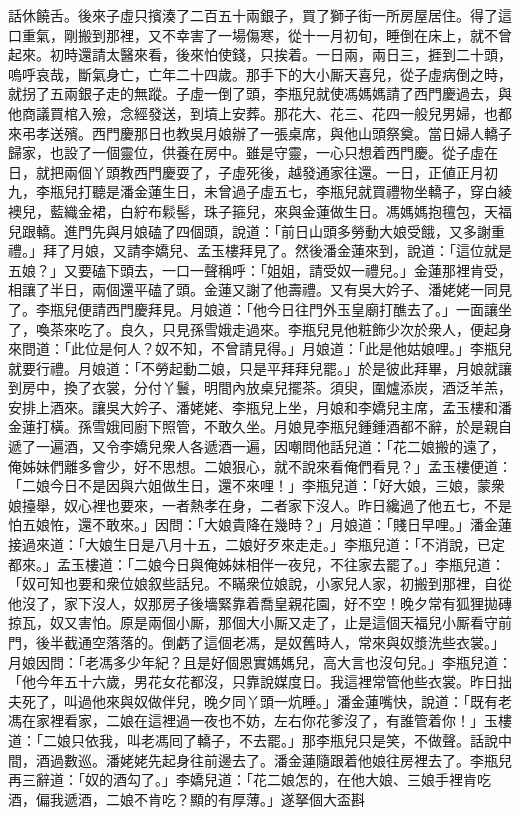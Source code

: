 話休饒舌。後來子虛只擯湊了二百五十兩銀子，買了獅子街一所房屋居住。得了這口重氣，剛搬到那裡，又不幸害了一場傷寒，從十一月初旬，睡倒在床上，就不曾起來。初時還請太醫來看，後來怕使錢，只挨着。一日兩，兩日三，捱到二十頭，嗚呼哀哉，斷氣身亡，亡年二十四歲。{}那手下的大小厮天喜兒，從子虛病倒之時，就拐了五兩銀子走的無蹤。子虛一倒了頭，李瓶兒就使馮媽媽請了西門慶過去，與他商議買棺入殮，念經發送，到墳上安葬。那花大、花三、花四一般兒男婦，也都來弔孝送殯。{}西門慶那日也教吳月娘辦了一張桌席，與他山頭祭奠。當日婦人轎子歸家，也設了一個靈位，供養在房中。雖是守靈，一心只想着西門慶。從子虛在日，就把兩個丫頭教西門慶耍了，子虛死後，越發通家往還。一日，正値正月初九，李瓶兒打聽是潘金蓮生日，未曾過子虛五七，李瓶兒就買禮物坐轎子，穿白綾襖兒，藍織金裙，白紵布鬏髻，珠子箍兒，來與金蓮做生日。馮媽媽抱氊包，天福兒跟轎。進門先與月娘磕了四個頭，說道：「前日山頭多勞動大娘受餓，又多謝重禮。」拜了月娘，又請李嬌兒、孟玉樓拜見了。然後潘金蓮來到，說道：「這位就是五娘？」{}又要磕下頭去，一口一聲稱呼：「姐姐，{}請受奴一禮兒。」金蓮那裡肯受，相讓了半日，兩個還平磕了頭。金蓮又謝了他壽禮。又有吳大妗子、潘姥姥一同見了。{}李瓶兒便請西門慶拜見。月娘道：「他今日往門外玉皇廟打醮去了。」一面讓坐了，喚茶來吃了。良久，只見孫雪娥走過來。李瓶兒見他粧飾少次於衆人，便起身來問道：「此位是何人？奴不知，不曾請見得。」月娘道：「此是他姑娘哩。」李瓶兒就要行禮。月娘道：「不勞起動二娘，只是平拜拜兒罷。」於是彼此拜畢，月娘就讓到房中，換了衣裳，分付丫鬟，明間內放桌兒擺茶。須臾，圍爐添炭，酒泛羊羔，安排上酒來。讓吳大妗子、潘姥姥、李瓶兒上坐，月娘和李嬌兒主席，孟玉樓和潘金蓮打橫。孫雪娥囘廚下照管，不敢久坐。月娘見李瓶兒鍾鍾酒都不辭，於是親自遞了一遍酒，又令李嬌兒衆人各遞酒一遍，因嘲問他話兒道：「花二娘搬的遠了，俺姊妹們離多會少，好不思想。二娘狠心，就不說來看俺們看見？」孟玉樓便道：「二娘今日不是因與六姐做生日，還不來哩！」李瓶兒道：「好大娘，三娘，蒙衆娘擡舉，{}奴心裡也要來，一者熱孝在身，二者家下沒人。昨日纔過了他五七，不是怕五娘恠，還不敢來。」因問：「大娘貴降在幾時？」月娘道：「賤日早哩。」潘金蓮接過來道：「大娘生日是八月十五，二娘好歹來走走。」李瓶兒道：「不消說，已定都來。」孟玉樓道：「二娘今日與俺姊妹相伴一夜兒，不往家去罷了。」李瓶兒道：「奴可知也要和衆位娘叙些話兒。不瞞衆位娘說，小家兒人家，初搬到那裡，自從他沒了，家下沒人，奴那房子後墻緊靠着喬皇親花園，好不空！{}晚夕常有狐狸拋磚掠瓦，奴又害怕。原是兩個小厮，那個大小厮又走了，止是這個天福兒小厮看守前門，後半截通空落落的。倒虧了這個老馮，是奴舊時人，常來與奴漿洗些衣裳。」月娘因問：「老馮多少年紀？且是好個恩實媽媽兒，高大言也沒句兒。」李瓶兒道：「他今年五十六歲，男花女花都沒，只靠說媒度日。我這裡常管他些衣裳。昨日拙夫死了，叫過他來與奴做伴兒，晚夕同丫頭一炕睡。」潘金蓮嘴快，說道：「既有老馮在家裡看家，二娘在這裡過一夜也不妨，左右你花爹沒了，有誰管着你！」{}玉樓道：「二娘只依我，叫老馮囘了轎子，不去罷。」那李瓶兒只是笑，不做聲。{}話說中間，酒過數巡。潘姥姥先起身往前邊去了。潘金蓮隨跟着他娘往房裡去了。李瓶兒再三辭道：「奴的酒勾了。」李嬌兒道：「花二娘怎的，在他大娘、三娘手裡肯吃酒，偏我遞酒，二娘不肯吃？顯的有厚薄。」遂拏個大盃斟